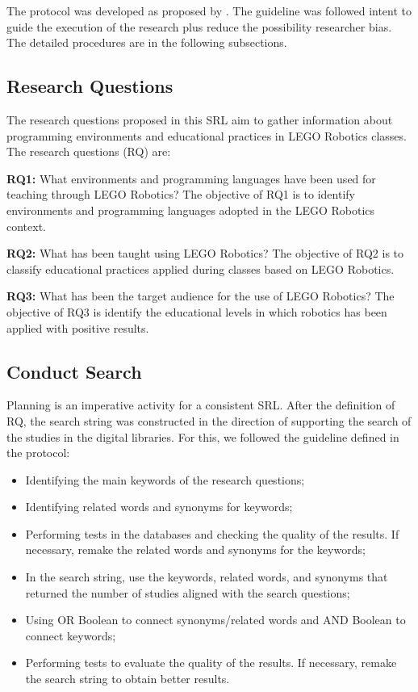 \documentclass[conference]{IEEEtran}
\begin{document}
The protocol was developed as proposed by \cite{Kitchenham}. The guideline was followed intent to guide the execution of the research plus reduce the possibility researcher bias. The detailed procedures are in the following subsections.

\subsection{Research Questions}

The research questions proposed in this SRL aim to gather information about programming environments and educational practices in  LEGO Robotics classes. The research questions (RQ) are: 

\textbf{RQ1:} What environments and programming languages have been used for teaching through LEGO Robotics? 
The objective of RQ1 is to identify environments and programming languages adopted in the LEGO Robotics context. 

\textbf{RQ2:} What has been taught using LEGO Robotics? 
 	The objective of RQ2 is to classify educational practices applied during classes based on LEGO Robotics. 

\textbf{RQ3:} What has been the target audience for the use of LEGO Robotics?
The objective of RQ3 is identify the educational levels in which robotics has been applied with positive results. 

\subsection{Conduct Search}

Planning is an imperative activity for a consistent SRL. After the definition of RQ,  the search string was constructed in the direction of supporting the search of the studies in the digital libraries. For this, we followed the guideline defined in the protocol:

\begin{itemize}

\item Identifying the main keywords of the research questions;
\item Identifying related words and synonyms for keywords;
\item Performing tests in the databases and checking the quality of the results. If necessary, remake the related words and synonyms for the keywords;
\item In the search string, use the keywords, related words, and synonyms that returned the number of studies aligned with the search questions; 
\item Using OR Boolean to connect synonyms/related words and AND Boolean to connect keywords;
\item Performing tests to evaluate the quality of the results. If necessary, remake the search string to obtain better results.

\end{itemize}
\end{document}
